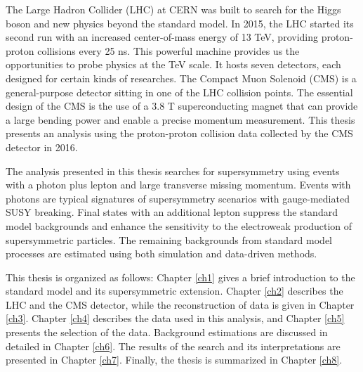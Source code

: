 \documentclass[12pt,oneside]{memoir}
\begin{document}
The Large Hadron Collider (LHC) at CERN was built to search for the Higgs boson and new physics beyond the standard model.
In 2015, the LHC started its second run with an increased center-of-mass energy of 13 TeV, providing proton-proton collisions every 25 ns. 
This powerful machine provides us the opportunities to probe physics at the TeV scale. 
It hosts seven detectors, each designed for certain kinds of researches. 
The Compact Muon Solenoid (CMS) is a general-purpose detector sitting in one of the LHC collision points. 
The essential design of the CMS is the use of a 3.8 T superconducting magnet that can provide a large bending power and enable a precise momentum measurement. 
This thesis presents an analysis using the proton-proton collision data collected by the CMS detector in 2016. 

The analysis presented in this thesis searches for supersymmetry using events with a photon plus lepton and large transverse missing momentum.  
Events with photons are typical signatures of supersymmetry scenarios with gauge-mediated SUSY breaking.
Final states with an additional lepton suppress the standard model backgrounds and enhance the sensitivity to the electroweak production of supersymmetric particles.
The remaining backgrounds from standard model processes are estimated using both simulation and data-driven methods. 

This thesis is organized as follows: Chapter \ref{ch1} gives a brief introduction to the standard model and its supersymmetric extension. Chapter \ref{ch2} describes the LHC and the CMS detector, while the reconstruction of data is given in Chapter \ref{ch3}. Chapter \ref{ch4} describes the data used in this analysis, and Chapter  \ref{ch5} presents the selection of the data. Background estimations are discussed in detailed in Chapter \ref{ch6}. The results of the search and its interpretations are presented in Chapter \ref{ch7}. Finally, the thesis is summarized in Chapter \ref{ch8}.

 









\newpage


\end{document}
